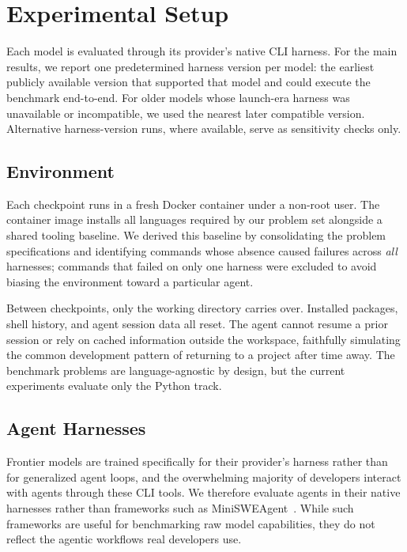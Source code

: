 \section{Experimental Setup}
\label{sec:experiment-setup}

Each model is evaluated through its provider's native CLI harness. For the main results, we report one predetermined harness version per model: the earliest publicly available version that supported that model and could execute the benchmark end-to-end. For older models whose launch-era harness was unavailable or incompatible, we used the nearest later compatible version. Alternative harness-version runs, where available, serve as sensitivity checks only.

\subsection{Environment}\label{sec:eval-env}

Each checkpoint runs in a fresh Docker container under a non-root user. The container image installs all languages required by our problem set alongside a shared tooling baseline. We derived this baseline by consolidating the problem specifications and identifying commands whose absence caused failures across \emph{all} harnesses; commands that failed on only one harness were excluded to avoid biasing the environment toward a particular agent.

Between checkpoints, only the working directory carries over. Installed packages, shell history, and agent session data all reset. The agent cannot resume a prior session or rely on cached information outside the workspace, faithfully simulating the common development pattern of returning to a project after time away. The benchmark problems are language-agnostic by design, but the current experiments evaluate only the Python track.

\subsection{Agent Harnesses}\label{sec:eval-agent}

Frontier models are trained specifically for their provider's harness rather than for generalized agent loops, and the overwhelming majority of developers interact with agents through these CLI tools. We therefore evaluate agents in their native harnesses rather than frameworks such as MiniSWEAgent~\citep{minisweagent}. While such frameworks are useful for benchmarking raw model capabilities, they do not reflect the agentic workflows real developers use.

